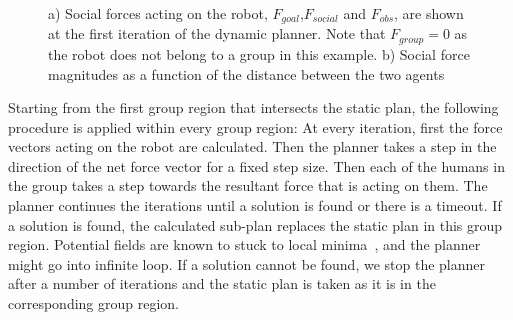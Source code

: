 \begin{figure}[ht!]
\centering
%
    \caption{%
	a) Social forces acting on the robot, $F_{goal}$,$F_{social}$ and $F_{obs}$, are shown at the first iteration of the dynamic planner. Note that $F_{group}=0$ as the robot does not belong to a group in this example. b) Social force magnitudes as a function of the distance between the two agents
     }%
   \label{fig:forces}
\end{figure}

Starting from the first group region that intersects the static plan, the following procedure is applied within every group region: At every iteration, first the force vectors acting on the robot are calculated. Then the planner takes a step in the direction of the net force vector for a fixed step size. Then each of the humans in the group takes a step towards the resultant force that is acting on them. The planner continues the iterations until a solution is found or there is a timeout. If a solution is found, the calculated sub-plan replaces the static plan in this group region. Potential fields are known to stuck to local minima~\cite{koren1991potential}, and the planner might go into infinite loop. If a solution cannot be found, we stop the planner after a number of iterations and the static plan is taken as it is in the corresponding group region.

